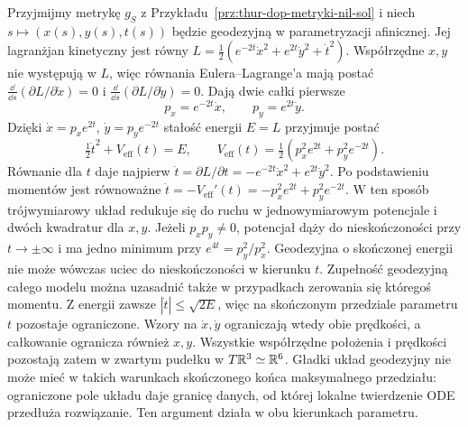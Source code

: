 \begin{przyklad}
\label{prz:thur-dop-geodezyjne-sol}
Przyjmijmy metrykę $g_S$ z Przykładu~\ref{prz:thur-dop-metryki-nil-sol}
i niech $s\mapsto (x(s),y(s),t(s))$ będzie geodezyjną
w parametryzacji afinicznej. Jej lagranżjan kinetyczny jest równy
$L=\tfrac12(e^{-2t}\dot x^2+e^{2t}\dot y^2+\dot t^2)$.
Współrzędne $x,y$ nie występują w $L$, więc równania
Eulera--Lagrange'a mają postać
$\frac{\dd}{\dd s}(\partial L/\partial\dot x)=0$
i $\frac{\dd}{\dd s}(\partial L/\partial\dot y)=0$.
Dają dwie całki pierwsze
\begin{equation}\label{eq:thur-dop-sol-momenty}
 p_x=e^{-2t}\dot x,\qquad p_y=e^{2t}\dot y.
\end{equation}
Dzięki $\dot x=p_xe^{2t}$, $\dot y=p_ye^{-2t}$
stałość energii $E=L$ przyjmuje postać
\begin{equation}\label{eq:thur-dop-sol-energia}
 \tfrac12\dot t^2+V_{\mathrm{eff}}(t)=E,\qquad
 V_{\mathrm{eff}}(t)=\tfrac12(p_x^2e^{2t}+p_y^2e^{-2t}).
\end{equation}
Równanie dla $t$ daje najpierw
$\ddot t=\partial L/\partial t=-e^{-2t}\dot x^2+e^{2t}\dot y^2$.
Po podstawieniu momentów jest równoważne
$\ddot t=-V_{\mathrm{eff}}'(t)
=-p_x^2e^{2t}+p_y^2e^{-2t}$.
W ten sposób trójwymiarowy układ redukuje się do ruchu
w jednowymiarowym potencjale i dwóch kwadratur dla $x,y$.
Jeżeli $p_xp_y\ne0$, potencjał dąży do nieskończoności
przy $t\to\pm\infty$ i ma jedno minimum przy
$e^{4t}=p_y^2/p_x^2$. Geodezyjna o skończonej energii
nie może wówczas uciec do nieskończoności w kierunku $t$.
Zupełność geodezyjną całego modelu można uzasadnić także
w przypadkach zerowania się któregoś momentu.
Z energii zawsze $|\dot t|\leq\sqrt{2E}$,
więc na skończonym przedziale parametru $t$ pozostaje ograniczone.
Wzory na $\dot x,\dot y$ ograniczają wtedy obie prędkości,
a całkowanie ogranicza również $x,y$.
Wszystkie współrzędne położenia i prędkości pozostają
zatem w zwartym pudełku w $T\mathbb{R}^3\simeq\mathbb{R}^6$.
Gładki układ geodezyjny nie może mieć w takich warunkach
skończonego końca maksymalnego przedziału: ograniczone
pole układu daje granicę danych, od której lokalne
twierdzenie ODE przedłuża rozwiązanie.
Ten argument działa w obu kierunkach parametru.
\end{przyklad}


